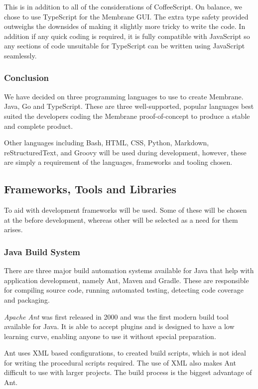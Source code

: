 \documentclass[11pt, a4paper, twoside]{report}
\begin{document}
This is in addition to all of the considerations of CoffeeScript. On balance, we chose to use TypeScript for the Membrane GUI. The extra type safety provided outweighs the downsides of making it slightly more tricky to write the code. In addition if any quick coding is required, it is fully compatible with JavaScript so any sections of code unsuitable for TypeScript can be written using JavaScript seamlessly.

\subsubsection{Conclusion}

We have decided on three programming languages to use to create Membrane. Java, Go and TypeScript. These are three well-supported, popular languages best suited the developers coding the Membrane proof-of-concept to produce a stable and complete product.

Other languages including Bash, HTML, CSS, Python, Markdown, reStructuredText, and Groovy will be used during development, however, these are simply a requirement of the languages, frameworks and tooling chosen.

\subsection{Frameworks, Tools and Libraries}

To aid with development frameworks will be used. Some of these will be chosen at the before development, whereas other will be selected as a need for them arises.

\subsubsection{Java Build System}

There are three major build automation systems available for Java that help with application development, namely Ant, Maven and Gradle. These are responsible for compiling source code, running automated testing, detecting code coverage and packaging.

\emph{Apache Ant} was first released in 2000 and was the first modern build tool available for Java. It is able to accept plugins and is designed to have a low learning curve, enabling anyone to use it without special preparation.

Ant uses XML based configurations, to created build scripts, which is not ideal for writing the procedural scripts required. The use of XML also makes Ant difficult to use with larger projects. The build process is the biggest advantage of Ant.
\end{document}
